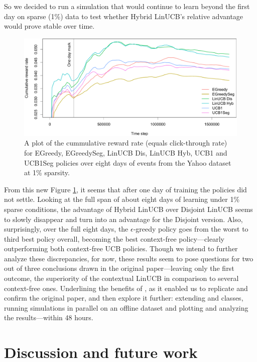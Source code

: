 \documentclass{jss}
\begin{document}
So we decided to run a simulation that would continue to learn beyond the first day on sparse (1\%) data to test whether Hybrid LinUCB's relative advantage would prove stable over time.

\begin{figure}[H]
  \centering
    \includegraphics[width=.99\textwidth]{fig/section_8_plot}
      \caption{A plot of the cummulative reward rate (equals click-through rate) for EGreedy, EGreedySeg, LinUCB Dis, LinUCB Hyb, UCB1 and UCB1Seg policies over eight days of events from the Yahoo dataset at 1\% sparsity.}
      \label{fig:section_8_plot}
\end{figure}

From this new Figure \ref{fig:section_8_plot}, it seems that after one day of training the policies did not settle. Looking at the full span of about eight days of learning under 1\% sparse conditions, the advantage of Hybrid LinUCB over Disjoint LinUCB seems to slowly disappear and turn into an advantage for the Disjoint version. Also, surprisingly, over the full eight days, the $\epsilon$-greedy policy goes from the worst to third best policy overall, becoming the best context-free policy---clearly outperforming both context-free UCB policies. Though we intend to further analyze these discrepancies, for now, these results seem to pose questions for two out of three conclusions drawn in the original paper---leaving only the first outcome, the superiority of the contextual LinUCB in comparison to several context-free ones.  Underlining the benefits of , as it enabled us to replicate and confirm the original \cite{Li2010} paper, and then explore it further: extending  and  classes, running simulations in parallel on an offline dataset and plotting and analyzing the results---within 48 hours.

\section{Discussion and future work} \label{future}
\end{document}
